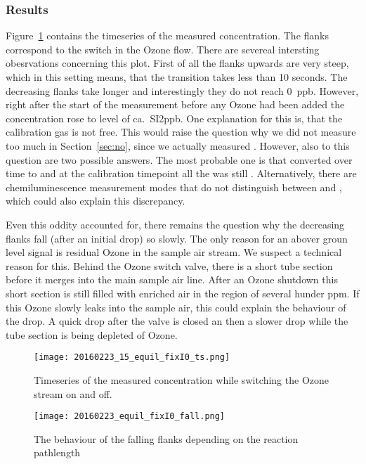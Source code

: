 \subsubsection{Results}
\label{sec:switch-results}

Figure~\ref{fig:switch} contains the timeseries of the measured
 concentration. The flanks correspond to the switch in the
Ozone flow. There are severeal intersting obesrvations concerning this
plot. First of all the flanks upwards are very steep, which in this
setting means, that the transition takes less than 10 seconds. The
decreasing flanks take longer and interestingly they do not reach
\SI{0}{ppb}. However, right after the start of the measurement before
any Ozone had been added the concentration rose to level of ca.\
SI{2}{ppb}. One explanation for this is, that the calibration gas is
not \ch{NO2} free. This would raise the question why we did not
measure too much  in Section~\ref{sec:no}, since we actually
measured \ch{NO_x}. However, also to this question are two possible
answers. The most probable one is that  converted over time to
 and at the calibration timepoint all the  was still
. Alternatively, there are chemiluminescence measurement modes
that do not distinguish between \ch{NO} and \ch{NO2}, which could also
explain this discrepancy. 

Even this oddity accounted for, there remains the question why the
decreasing flanks fall (after an initial drop) so slowly. The only
reason for an abover groun level \ch{NO2} signal is residual Ozone in
the sample air stream. We suspect a technical reason for this. Behind
the Ozone switch valve, there is a short tube section before it merges
into the main sample air line. After an Ozone shutdown this short
section is still filled with \ch{O3} enriched air in the region of
several hunder \si{ppm}. If this Ozone slowly leaks into the sample
air, this could explain the behaviour of the drop. A quick drop after
the valve is closed an then a slower drop while the tube section is
being depleted of Ozone.

\begin{figure}[htbp]
  \centering
  \texttt{[image: 20160223\_15\_equil\_fixI0\_ts.png]}
  \caption{Timeseries of the measured  concentration while
    switching the Ozone stream on and off.}
  \label{fig:switch}
\end{figure}

\begin{figure}[htbp]
  \centering
  \texttt{[image: 20160223\_equil\_fixI0\_fall.png]}
  \caption{The behaviour of the falling flanks depending on the
    reaction pathlength}
  \label{fig:switch-pl}
\end{figure}


